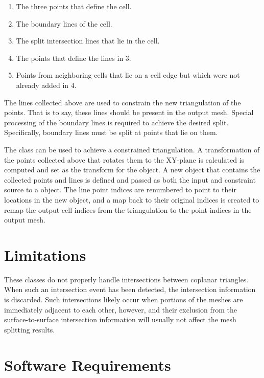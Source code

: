 \documentclass{InsightArticle}
\begin{document}
\begin{enumerate}
\item The three points that define the cell.
\item The boundary lines of the cell.
\item The split intersection lines that lie in the cell.
\item The points that define the lines in 3.
\item Points from neighboring cells that lie on a cell edge but which were not already added in 4.
\end{enumerate}

The lines collected above are used to constrain the new triangulation of the points. That is to say, these lines should be present in the output mesh. Special processing of the boundary lines is required to achieve the desired split. Specifically, boundary lines must be split at points that lie on them.

The  class can be used to achieve a constrained triangulation. A transformation of the points collected above that rotates them to the XY-plane is calculated is computed and set as the transform for the  object. A new  object that contains the collected points and lines is defined and passed as both the input and constraint source to a  object. The line point indices are renumbered to point to their locations in the new  object, and a map back to their original indices is created to remap the output cell indices from the triangulation to the point indices in the output mesh.

\section{Limitations}

These classes do not properly handle intersections between coplanar triangles. When such an intersection event has been detected, the intersection information is discarded. Such intersections likely occur when portions of the meshes are immediately adjacent to each other, however, and their exclusion from the surface-to-surface intersection information will usually not affect the mesh splitting results.

\section{Software Requirements}
\end{document}
